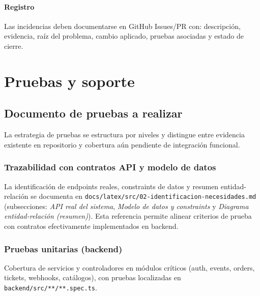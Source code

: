 \documentclass[
  11pt,
  a4paper,
  twoside=false,
  parskip=half               %
]{scrreprt}                  %
\begin{document}
\hypertarget{registro}{%
\subsubsection{Registro}\label{registro}}

Las incidencias deben documentarse en GitHub Issues/PR con: descripción,
evidencia, raíz del problema, cambio aplicado, pruebas asociadas y
estado de cierre.

\hypertarget{pruebas-y-soporte}{%
\chapter{Pruebas y soporte}\label{pruebas-y-soporte}}

\hypertarget{documento-de-pruebas-a-realizar}{%
\section{Documento de pruebas a
realizar}\label{documento-de-pruebas-a-realizar}}

La estrategia de pruebas se estructura por niveles y distingue entre
evidencia existente en repositorio y cobertura aún pendiente de
integración funcional.

\hypertarget{trazabilidad-con-contratos-api-y-modelo-de-datos}{%
\subsection{Trazabilidad con contratos API y modelo de
datos}\label{trazabilidad-con-contratos-api-y-modelo-de-datos}}

La identificación de endpoints reales, constraints de datos y resumen
entidad-relación se documenta en
\texttt{docs/latex/src/02-identificacion-necesidades.md} (subsecciones:
\emph{API real del sistema}, \emph{Modelo de datos y constraints} y
\emph{Diagrama entidad-relación (resumen)}). Esta referencia permite
alinear criterios de prueba con contratos efectivamente implementados en
backend.

\hypertarget{pruebas-unitarias-backend}{%
\subsection{Pruebas unitarias
(backend)}\label{pruebas-unitarias-backend}}

Cobertura de servicios y controladores en módulos críticos (auth,
events, orders, tickets, webhooks, catálogos), con pruebas localizadas
en \texttt{backend/src/**/**.spec.ts}.
\end{document}
